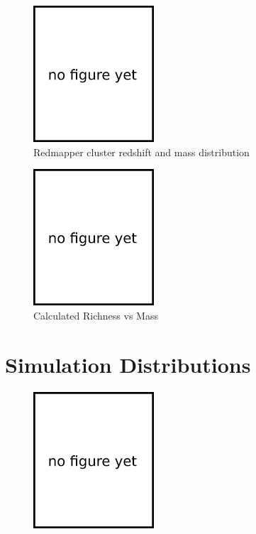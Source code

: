 \documentclass[twocolumn]{article}
\begin{document}
\begin{figure}[H]
  \center\includegraphics[width=0.4\textwidth]{figs/404.png}
  \caption{Redmapper cluster redshift and mass distribution}
  \label{fig:redmapper_redshift_mass}
\end{figure}

\begin{figure}[H]
  \center\includegraphics[width=0.4\textwidth]{figs/404.png}
  \caption{Calculated Richness vs Mass}
  \label{fig:redmapper_richness_mass}
\end{figure}

\clearpage

\section{Simulation Distributions}

\begin{figure}[H]
  \center\includegraphics[width=0.4\textwidth]{figs/404.png}
  \caption{}
  \label{fig:simulation_mass_redshift}
\end{figure}
\end{document}
